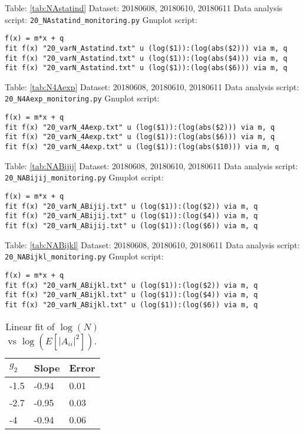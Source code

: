 \documentclass[12pt,a4paper]{article}
\begin{document}
\mbox{}\newline
Table: \ref{tab:NAstatind} \newline
Dataset: 20180608, 20180610, 20180611\newline
Data analysis script: \verb|20_NAstatind_monitoring.py|\newline
Gnuplot script:
\begin{lstlisting}
f(x) = m*x + q
fit f(x) "20_varN_Astatind.txt" u (log($1)):(log(abs($2))) via m, q
fit f(x) "20_varN_Astatind.txt" u (log($1)):(log(abs($4))) via m, q
fit f(x) "20_varN_Astatind.txt" u (log($1)):(log(abs($6))) via m, q
\end{lstlisting}
\mbox{}\newline
Table: \ref{tab:N4Aexp} \newline
Dataset: 20180608, 20180610, 20180611\newline
Data analysis script: \verb|20_N4Aexp_monitoring.py|\newline
Gnuplot script:
\begin{lstlisting}
f(x) = m*x + q
fit f(x) "20_varN_4Aexp.txt" u (log($1)):(log(abs($2))) via m, q
fit f(x) "20_varN_4Aexp.txt" u (log($1)):(log(abs($6))) via m, q
fit f(x) "20_varN_4Aexp.txt" u (log($1)):(log(abs($10))) via m, q
\end{lstlisting}
\mbox{}\newline
Table: \ref{tab:NABijij} \newline
Dataset: 20180608, 20180610, 20180611\newline
Data analysis script: \verb|20_NABijij_monitoring.py|\newline
Gnuplot script:
\begin{lstlisting}
f(x) = m*x + q
fit f(x) "20_varN_ABijij.txt" u (log($1)):(log($2)) via m, q
fit f(x) "20_varN_ABijij.txt" u (log($1)):(log($4)) via m, q
fit f(x) "20_varN_ABijij.txt" u (log($1)):(log($6)) via m, q
\end{lstlisting}
Table: \ref{tab:NABijkl} \newline
Dataset: 20180608, 20180610, 20180611\newline
Data analysis script: \verb|20_NABijkl_monitoring.py|\newline
Gnuplot script:
\begin{lstlisting}
f(x) = m*x + q
fit f(x) "20_varN_ABijkl.txt" u (log($1)):(log($2)) via m, q
fit f(x) "20_varN_ABijkl.txt" u (log($1)):(log($4)) via m, q
fit f(x) "20_varN_ABijkl.txt" u (log($1)):(log($6)) via m, q
\end{lstlisting}
\begin{table}[hp]
\centering
\begin{tabular}{|l|l|l|}
\hline
$g_2$ & Slope & Error \\ \hline
-1.5 & -0.94 & 0.01 \\ \hline
-2.7 & -0.95 & 0.03 \\ \hline
-4 & -0.94 & 0.06 \\ \hline
\end{tabular}
\caption{Linear fit of $\log(N)$ vs $\log(E[ |A_{ii}|^2 ])$.}
\label{tab:NA2iiexp}
\end{table}
\end{document}
